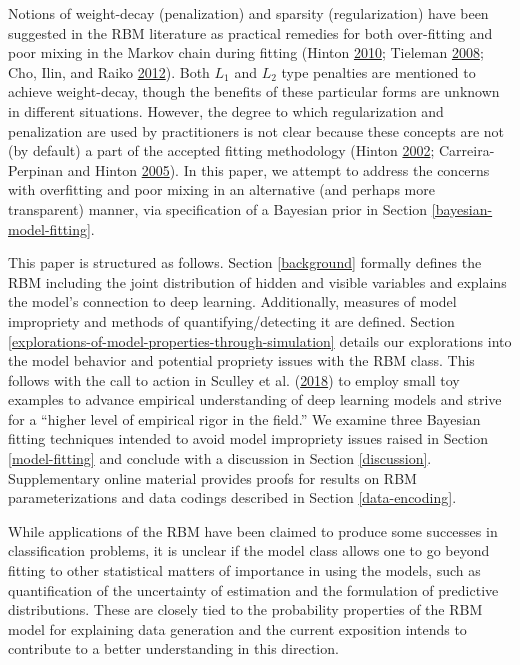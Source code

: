 \documentclass[]{article}
\theoremstyle{definition}
\begin{document}
Notions of weight-decay (penalization) and sparsity (regularization)
have been suggested in the RBM literature as practical remedies for both
over-fitting and poor mixing in the Markov chain during fitting (Hinton
\protect\hyperlink{ref-hinton2010practical}{2010}; Tieleman
\protect\hyperlink{ref-tieleman2008training}{2008}; Cho, Ilin, and Raiko
\protect\hyperlink{ref-cho2012tikhonov}{2012}). Both \(L_1\) and \(L_2\)
type penalties are mentioned to achieve weight-decay, though the
benefits of these particular forms are unknown in different situations.
However, the degree to which regularization and penalization are used by
practitioners is not clear because these concepts are not (by default) a
part of the accepted fitting methodology (Hinton
\protect\hyperlink{ref-hinton2002training}{2002}; Carreira-Perpinan and
Hinton \protect\hyperlink{ref-carreira2005contrastive}{2005}). In this
paper, we attempt to address the concerns with overfitting and poor
mixing in an alternative (and perhaps more transparent) manner, via
specification of a Bayesian prior in Section
\ref{bayesian-model-fitting}.

This paper is structured as follows. Section \ref{background} formally
defines the RBM including the joint distribution of hidden and visible
variables and explains the model's connection to deep learning.
Additionally, measures of model impropriety and methods of
quantifying/detecting it are defined. Section
\ref{explorations-of-model-properties-through-simulation} details our
explorations into the model behavior and potential propriety issues with
the RBM class. This follows with the call to action in Sculley et al.
(\protect\hyperlink{ref-sculley2018winner}{2018}) to employ small toy
examples to advance empirical understanding of deep learning models and
strive for a ``higher level of empirical rigor in the field.'' We
examine three Bayesian fitting techniques intended to avoid model
impropriety issues raised in Section \ref{model-fitting} and conclude
with a discussion in Section \ref{discussion}. Supplementary online
material provides proofs for results on RBM parameterizations and data
codings described in Section \ref{data-encoding}.

While applications of the RBM have been claimed to produce some
successes in classification problems, it is unclear if the model class
allows one to go beyond fitting to other statistical matters of
importance in using the models, such as quantification of the
uncertainty of estimation and the formulation of predictive
distributions. These are closely tied to the probability properties of
the RBM model for explaining data generation and the current exposition
intends to contribute to a better understanding in this direction.
\end{document}
